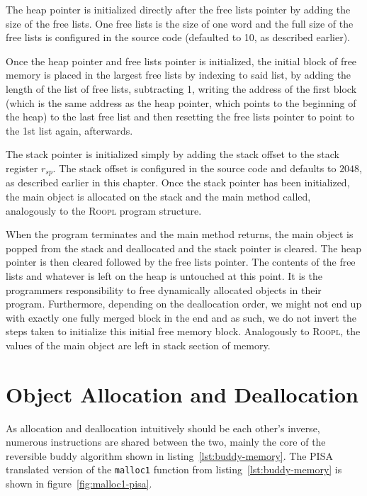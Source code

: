 The heap pointer is initialized directly after the free lists pointer by adding the size of the free lists. One free lists is the size of one word and the full size of the free lists is configured in the source code (defaulted to 10, as described earlier).

Once the heap pointer and free lists pointer is initialized, the initial block of free memory is placed in the largest free lists by indexing to said list, by adding the length of the list of free lists, subtracting 1, writing the address of the first block (which is the same address as the heap pointer, which points to the beginning of the heap) to the last free list and then resetting the free lists pointer to point to the 1st list again, afterwards.

The stack pointer is initialized simply by adding the stack offset to the stack register $r_{sp}$. The stack offset is configured in the source code and defaults to $2048$, as described earlier in this chapter. Once the stack pointer has been initialized, the main object is allocated on the stack and the main method called, analogously to the \textsc{Roopl} program structure.

When the program terminates and the main method returns, the main object is popped from the stack and deallocated and the stack pointer is cleared. The heap pointer is then cleared followed by the free lists pointer. The contents of the free lists and whatever is left on the heap is untouched at this point. It is the programmers responsibility to free dynamically allocated objects in their \rooplpp program. Furthermore, depending on the deallocation order, we might not end up with exactly one fully merged block in the end and as such, we do not invert the steps taken to initialize this initial free memory block.
Analogously to \textsc{Roopl}, the values of the main object are left in stack section of memory.


\section{Object Allocation and Deallocation}
\label{sec:object-allocation-deallocation}
As allocation and deallocation intuitively should be each other's inverse, numerous instructions are shared between the two, mainly the core of the reversible buddy algorithm shown in listing~\ref{lst:buddy-memory}. The PISA translated version of the \texttt{malloc1} function from listing~\ref{lst:buddy-memory} is shown in figure~\ref{fig:malloc1-pisa}.


